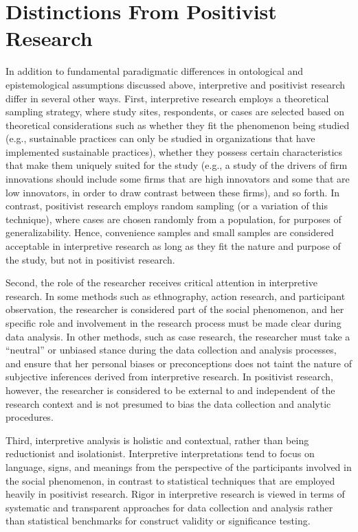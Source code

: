 \section{Distinctions From Positivist Research}

In addition to fundamental paradigmatic differences in ontological and epistemological assumptions discussed above, interpretive and positivist research differ in several other ways. First, interpretive research employs a theoretical sampling strategy, where study sites, respondents, or cases are selected based on theoretical considerations such as whether they fit the phenomenon being studied (e.g., sustainable practices can only be studied in organizations that have implemented sustainable practices), whether they possess certain characteristics that make them uniquely suited for the study (e.g., a study of the drivers of firm innovations should include some firms that are high innovators and some that are low innovators, in order to draw contrast between these firms), and so forth. In contrast, positivist research employs random sampling (or a variation of this technique), where cases are chosen randomly from a population, for purposes of generalizability. Hence, convenience samples and small samples are considered acceptable in interpretive research as long as they fit the nature and purpose of the study, but not in positivist research.

Second, the role of the researcher receives critical attention in interpretive research. In some methods such as ethnography, action research, and participant observation, the researcher is considered part of the social phenomenon, and her specific role and involvement in the research process must be made clear during data analysis. In other methods, such as case research, the researcher must take a “neutral” or unbiased stance during the data collection and analysis processes, and ensure that her personal biases or preconceptions does not taint the nature of subjective inferences derived from interpretive research. In positivist research, however, the researcher is considered to be external to and independent of the research context and is not presumed to bias the data collection and analytic procedures.

Third, interpretive analysis is holistic and contextual, rather than being reductionist and isolationist. Interpretive interpretations tend to focus on language, signs, and meanings from the perspective of the participants involved in the social phenomenon, in contrast to statistical techniques that are employed heavily in positivist research. Rigor in interpretive research is viewed in terms of systematic and transparent approaches for data collection and analysis rather than statistical benchmarks for construct validity or significance testing.

